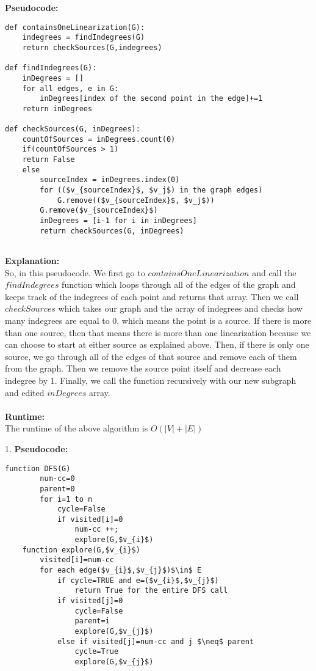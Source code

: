 \documentclass[letterpaper,11pt]{article}
\newcounter{problemid}\stepcounter{problemid}
\def\newproblem{\vspace*{0.5cm}{\bf Problem~\arabic{problemid}\stepcounter{problemid}}\hfill\fbox{\parbox{0.16\textwidth}{\bf Points:}}\par}
\begin{document}
{\bf Pseudocode: }
\begin{Verbatim}[commandchars=\\\{\},codes={\catcode`$=3\catcode`_=8}]
def containsOneLinearization(G):
    indegrees = findIndegrees(G)
    return checkSources(G,indegrees)

def findIndegrees(G):
    inDegrees = []
    for all edges, e in G:
        inDegrees[index of the second point in the edge]+=1
    return inDegrees
    
def checkSources(G, inDegrees):
    countOfSources = inDegrees.count(0)
    if(countOfSources > 1)
    return False
    else
        sourceIndex = inDegrees.index(0)
        for (($v_{sourceIndex}$, $v_j$) in the graph edges)
            G.remove(($v_{sourceIndex}$, $v_j$))
        G.remove($v_{sourceIndex}$)
        inDegrees = [i-1 for i in inDegrees]
        return checkSources(G, inDegrees)
    
\end{Verbatim}

{\bf Explanation: }\\
So, in this pseudocode. We first go to $containsOneLinearization$ and call the $findIndegrees$ function which loops through all of the edges of the graph and keeps track of the indegrees of each point and returns that array. Then we call $checkSources$ which takes our graph and the array of indegrees and checks how many indegrees are equal to 0, which means the point is a source. If there is more than one source, then that means there is more than one linearization because we can choose to start at either source as explained above. Then, if there is only one source, we go through all of the edges of that source and remove each of them from the graph. Then we remove the source point itself and decrease each indegree by 1. Finally, we call the function recursively with our new subgraph and edited $inDegrees$ array.\\
\\

{\bf Runtime: }\\
The runtime of the above algorithm is $O(|V| + |E|)$

\newproblem

1. {\bf Pseudocode: } \\
\begin{Verbatim}[commandchars=\\\{\},codes={\catcode`$=3\catcode`_=8}]
    function DFS(G)
        num-cc=0
        parent=0
        for i=1 to n
            cycle=False
            if visited[i]=0
                num-cc ++;
                explore(G,$v_{i}$)
    function explore(G,$v_{i}$)
        visited[i]=num-cc
        for each edge($v_{i}$,$v_{j}$)$\in$ E
            if cycle=TRUE and e=($v_{i}$,$v_{j}$)
                return True for the entire DFS call
            if visited[j]=0
                cycle=False
                parent=i
                explore(G,$v_{j}$)
            else if visited[j]=num-cc and j $\neq$ parent
                cycle=True
                explore(G,$v_{j}$)
    \end{Verbatim}
\end{document}
